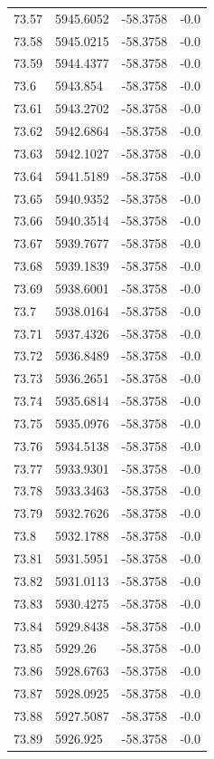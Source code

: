 \begin{table}[H]
\begin{tabular}{llll}
73.57 & 5945.6052 & -58.3758 & -0.0 \\
73.58 & 5945.0215 & -58.3758 & -0.0 \\
73.59 & 5944.4377 & -58.3758 & -0.0 \\
73.6 & 5943.854 & -58.3758 & -0.0 \\
73.61 & 5943.2702 & -58.3758 & -0.0 \\
73.62 & 5942.6864 & -58.3758 & -0.0 \\
73.63 & 5942.1027 & -58.3758 & -0.0 \\
73.64 & 5941.5189 & -58.3758 & -0.0 \\
73.65 & 5940.9352 & -58.3758 & -0.0 \\
73.66 & 5940.3514 & -58.3758 & -0.0 \\
73.67 & 5939.7677 & -58.3758 & -0.0 \\
73.68 & 5939.1839 & -58.3758 & -0.0 \\
73.69 & 5938.6001 & -58.3758 & -0.0 \\
73.7 & 5938.0164 & -58.3758 & -0.0 \\
73.71 & 5937.4326 & -58.3758 & -0.0 \\
73.72 & 5936.8489 & -58.3758 & -0.0 \\
73.73 & 5936.2651 & -58.3758 & -0.0 \\
73.74 & 5935.6814 & -58.3758 & -0.0 \\
73.75 & 5935.0976 & -58.3758 & -0.0 \\
73.76 & 5934.5138 & -58.3758 & -0.0 \\
73.77 & 5933.9301 & -58.3758 & -0.0 \\
73.78 & 5933.3463 & -58.3758 & -0.0 \\
73.79 & 5932.7626 & -58.3758 & -0.0 \\
73.8 & 5932.1788 & -58.3758 & -0.0 \\
73.81 & 5931.5951 & -58.3758 & -0.0 \\
73.82 & 5931.0113 & -58.3758 & -0.0 \\
73.83 & 5930.4275 & -58.3758 & -0.0 \\
73.84 & 5929.8438 & -58.3758 & -0.0 \\
73.85 & 5929.26 & -58.3758 & -0.0 \\
73.86 & 5928.6763 & -58.3758 & -0.0 \\
73.87 & 5928.0925 & -58.3758 & -0.0 \\
73.88 & 5927.5087 & -58.3758 & -0.0 \\
73.89 & 5926.925 & -58.3758 & -0.0 \\

\end{tabular}
\end{table}
